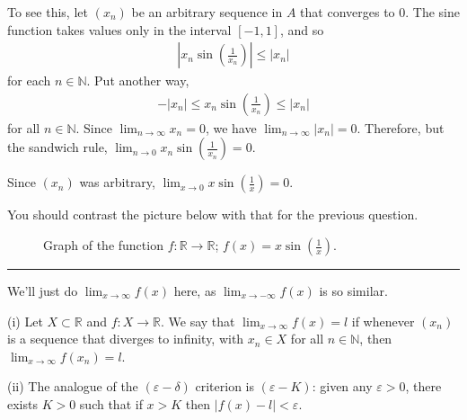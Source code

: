 \documentclass[letterpaper,10pt,english]{jupyterBook}
\let\sphinxpxdimen\pdfpxdimen\else\newdimen\sphinxpxdimen
\begin{document}
To see this, let \((x_{n})\) be an arbitrary sequence in \(A\) that converges to \(0\). The sine function takes values only in the interval \([-1,1]\), and so
\begin{equation*}
\begin{split}
\left|x_n\sin\left(\frac{1}{x_n}\right)\right| \leq |x_n|
\end{split}
\end{equation*}
\sphinxAtStartPar
for each \(n\in\mathbb{N}\). Put another way,
\begin{equation*}
\begin{split}
-|x_{n}| \leq x_{n}\sin\left(\frac{1}{x_n}\right) \leq |x_{n}|
\end{split}
\end{equation*}
\sphinxAtStartPar
for all \(n\in\mathbb{N}\). Since \(\displaystyle\lim_{n\to \infty} x_n=0\), we have \( \displaystyle\lim_{n\to \infty} |x_n| =0\). Therefore, but the sandwich rule, \(\displaystyle\lim_{n\rightarrow 0}x_n\sin\left(\frac{1}{x_n}\right) = 0\).

Since \((x_n)\) was arbitrary, \(\displaystyle\lim_{x \rightarrow 0} x \sin\left(\frac{1}{x}\right) = 0\).

You should contrast the picture below with that for the previous question.

\begin{figure}[htbp]
\centering
\capstart

\noindent\sphinxincludegraphics[width=700\sphinxpxdimen]{{xsin(1,x)}.png}
\caption{Graph of the function \(f:\mathbb{R}\to\mathbb{R}\); \(f(x)=x\sin\left(\frac{1}{x}\right)\).}\label{\detokenize{Solutions-full:xs1x}}\end{figure}


\bigskip\hrule\bigskip


\sphinxAtStartPar
{\hyperref[\detokenize{Problems:id11}]{}} We’ll just do \(\displaystyle\lim_{x \rightarrow \infty}f(x)\) here, as \(\displaystyle\lim_{x \rightarrow -\infty}f(x)\) is so similar.

\sphinxAtStartPar
(i) Let \(X\subset\mathbb{R}\) and \(f:X\to\mathbb{R}\). We say that \(\lim_{x \rightarrow \infty}f(x) = l\) if whenever \((x_{n})\) is a sequence that diverges to infinity, with \(x_{n}\in X\) for all \(n\in\mathbb{N}\), then \(\lim_{x \rightarrow \infty}f(x_{n}) = l\).

\sphinxAtStartPar
(ii) The analogue of the \((\varepsilon- \delta)\) criterion is \((\varepsilon-K)\): given any \(\varepsilon > 0\), there exists \(K > 0\) such that if \(x > K\) then \(|f(x) -l| < \varepsilon\).
\end{document}
